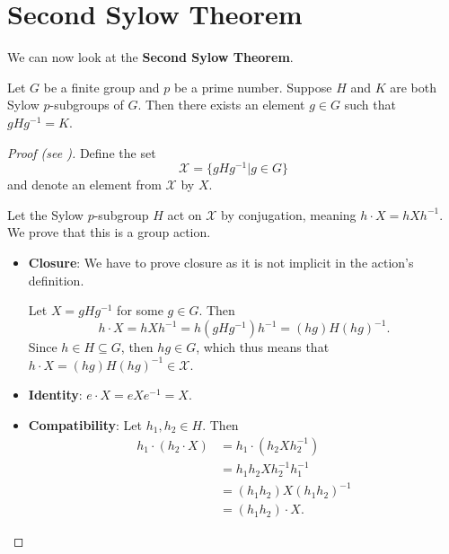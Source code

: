 \section{Second Sylow Theorem}
We can now look at the \textbf{Second Sylow Theorem}.
\begin{theorem}[Sylow II]\label{thrm-sylow-2}
    Let $G$ be a finite group and $p$ be a prime number. Suppose $H$ and $K$ are both Sylow $p$-subgroups of $G$. Then there exists an element $g \in G$ such that $gHg^{-1} = K$.
\end{theorem}
\begin{proof}[Proof (see {\cite[Theorem 11.10]{humphreys_1996}})]
    Define the set
    \[
        \mathcal{X} = \{gHg^{-1} \vert g \in G\}
    \]
    and denote an element from $\mathcal{X}$ by $X$.

    Let the Sylow $p$-subgroup $H$ act on $\mathcal{X}$ by conjugation, meaning $h \cdot X = hXh^{-1}$. We prove that this is a group action.
    
    \begin{itemize}
        \item \textbf{Closure}: We have to prove closure as it is not implicit in the action's definition.

        Let $X = gHg^{-1}$ for some $g \in G$. Then
        \[
            h\cdot X = hXh^{-1} = h(gHg^{-1})h^{-1} = (hg)H(hg)^{-1}.
        \]
        Since $h \in H \subseteq G$, then $hg \in G$, which thus means that $h \cdot X = (hg)H(hg)^{-1} \in \mathcal{X}$.
        \item \textbf{Identity}: $e \cdot X = eXe^{-1} = X$.
        \item \textbf{Compatibility}: Let $h_1, h_2 \in H$. Then
        \begin{align*}
            h_1 \cdot (h_2 \cdot X) &= h_1 \cdot (h_2Xh_2^{-1})\\
            &= h_1h_2Xh_2^{-1}h_1^{-1}\\
            &= (h_1h_2)X(h_1h_2)^{-1}\\
            &= (h_1h_2) \cdot X.
        \end{align*}
    \end{itemize}


\end{proof}
